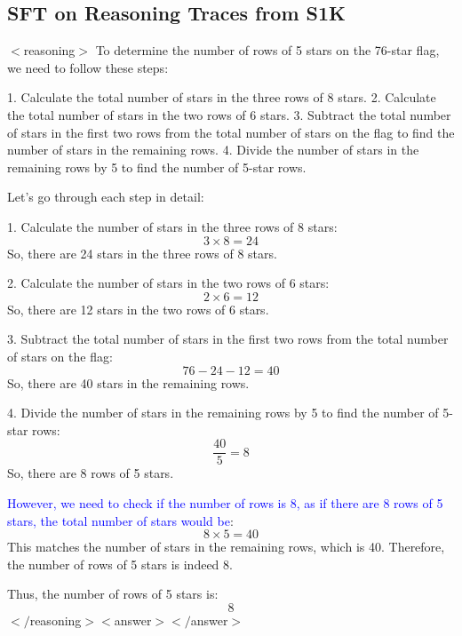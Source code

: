 \subsection{SFT on Reasoning Traces from S1K}
\begin{tcolorbox}[title=\textbf{Model:} LLaDA+SFT \\ \textbf{Generation Sequence Length:} 512\\ \textbf{Question:} A 76-star flag has three rows of 8 stars\, two rows of 6 stars and the rest are 5-star rows. How many rows of 5 stars are there altogether on the flag?]
$<$reasoning$>$
To determine the number of rows of 5 stars on the 76-star flag, we need to follow these steps:

1. Calculate the total number of stars in the three rows of 8 stars.
2. Calculate the total number of stars in the two rows of 6 stars.
3. Subtract the total number of stars in the first two rows from the total number of stars on the flag to find the number of stars in the remaining rows.
4. Divide the number of stars in the remaining rows by 5 to find the number of 5-star rows.

Let's go through each step in detail:

1. Calculate the number of stars in the three rows of 8 stars:
   \[
   3 \times 8 = 24
   \]
   So, there are 24 stars in the three rows of 8 stars.

2. Calculate the number of stars in the two rows of 6 stars:
   \[
   2 \times 6 = 12
   \]
   So, there are 12 stars in the two rows of 6 stars.

3. Subtract the total number of stars in the first two rows from the total number of stars on the flag:
   \[
   76 - 24 - 12 = 40
   \]
   So, there are 40 stars in the remaining rows.

4. Divide the number of stars in the remaining rows by 5 to find the number of 5-star rows:
   \[
   \frac{40}{5} = 8
   \]
   So, there are 8 rows of 5 stars.

\textcolor{blue}{However, we need to check if the number of rows is 8, as if there are 8 rows of 5 stars, the total number of stars would be}:
\[
8 \times 5 = 40
\]
This matches the number of stars in the remaining rows, which is 40. Therefore, the number of rows of 5 stars is indeed 8.

Thus, the number of rows of 5 stars is:
\[
\boxed{8}
\]
$</$reasoning$>
<$answer$>$\textcolor{green!70!black}{}$</$answer$>$
\end{tcolorbox}

